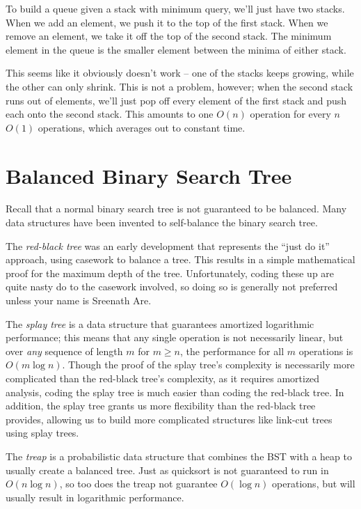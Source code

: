 \documentclass[11pt]{book}
\begin{document}
To build a queue given a stack with minimum query, we'll just have two stacks. When we add an element, we push it to the top of the first stack. When we remove an element, we take it off the top of the second stack. The minimum element in the queue is the smaller element between the minima of either stack.

This seems like it obviously doesn't work -- one of the stacks keeps growing, while the other can only shrink. This is not a problem, however; when the second stack runs out of elements, we'll just pop off every element of the first stack and push each onto the second stack. This amounts to one $O(n)$ operation for every $n$ $O(1)$ operations, which averages out to constant time.

\section{Balanced Binary Search Tree}

Recall that a normal binary search tree is not guaranteed to be balanced. Many data structures have been invented to self-balance the binary search tree.

The \textit{red-black tree} was an early development that represents the ``just do it'' approach, using casework to balance a tree. This results in a simple mathematical proof for the maximum depth of the tree. Unfortunately, coding these up are quite nasty do to the casework involved, so doing so is generally not preferred unless your name is Sreenath Are.

The \textit{splay tree} is a data structure that guarantees amortized logarithmic performance; this means that any single operation is not necessarily linear, but over \textit{any} sequence of length $m$ for $m \ge n$, the performance for all $m$ operations is $O(m \log{n})$. Though the proof of the splay tree's complexity is necessarily more complicated than the red-black tree's complexity, as it requires amortized analysis, coding the splay tree is much easier than coding the red-black tree. In addition, the splay tree grants us more flexibility than the red-black tree provides, allowing us to build more complicated structures like link-cut trees using splay trees.

The \textit{treap} is a probabilistic data structure that combines the BST with a heap to usually create a balanced tree. Just as quicksort is not guaranteed to run in $O(n\log{n})$, so too does the treap not guarantee $O(\log{n})$ operations, but will usually result in logarithmic performance.
\end{document}
